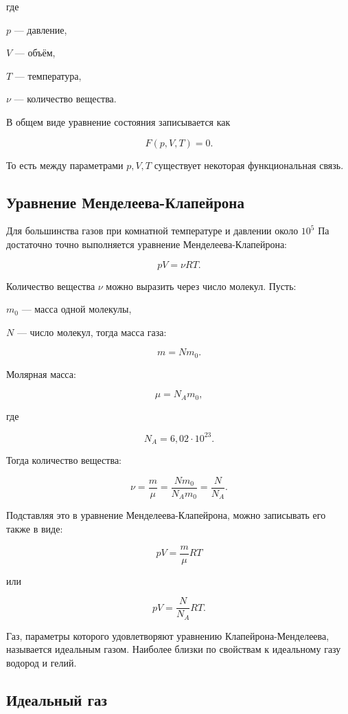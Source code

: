 \documentclass[a4paper,12pt]{article}
\begin{document}
где

$p$ — давление,

$V$ — объём,

$T$ — температура,

$\nu$ — количество вещества.

В общем виде уравнение состояния записывается как

\[
F(p,V,T)=0.
\]

То есть между параметрами $p,V,T$ существует некоторая функциональная связь.

\subsection*{Уравнение Менделеева-Клапейрона}

Для большинства газов при комнатной температуре и давлении около $10^5$ Па достаточно точно выполняется уравнение Менделеева-Клапейрона:

\begin{theorembox}
\[
pV=\nu RT.
\]
\end{theorembox}
 

Количество вещества $\nu$ можно выразить через число молекул. Пусть:

$m_0$ — масса одной молекулы,

$N$ — число молекул, тогда масса газа:

\[
m=Nm_0.
\]

Молярная масса:

\[
\mu=N_A m_0,
\]

где

\[
N_A=6{,}02\cdot10^{23}.
\]

Тогда количество вещества:

\[
\nu=\frac{m}{\mu}=\frac{Nm_0}{N_A m_0}=\frac{N}{N_A}.
\]

Подставляя это в уравнение Менделеева-Клапейрона, можно записывать его также в виде:

\[
pV=\frac{m}{\mu}RT
\]

или

\[
pV=\frac{N}{N_A}RT.
\]

Газ, параметры которого удовлетворяют уравнению Клапейрона-Менделеева, называется идеальным газом. Наиболее близки по свойствам к идеальному газу водород и гелий.

\subsection*{Идеальный газ}
\end{document}
